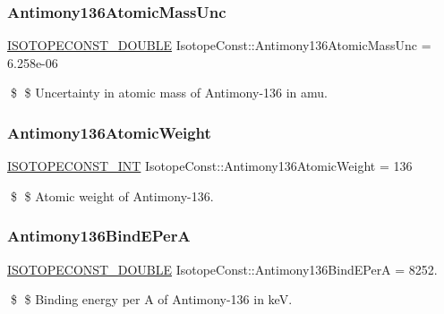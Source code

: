 \subsubsection{\texorpdfstring{Antimony136\+Atomic\+Mass\+Unc}{Antimony136AtomicMassUnc}}
{\footnotesize\ttfamily \mbox{\hyperlink{group___isotope_const-_macros_ga8f45a7272ce02c0b4c65c44636ed719a}{I\+S\+O\+T\+O\+P\+E\+C\+O\+N\+S\+T\+\_\+\+D\+O\+U\+B\+LE}} Isotope\+Const\+::\+Antimony136\+Atomic\+Mass\+Unc = 6.\+258e-\/06}

\$ \$ Uncertainty in atomic mass of Antimony-\/136 in amu. \mbox{\label{group___isotope_const-_antimony-_sb136_ga4523e8831250f585dc2350383171b064}} 
\subsubsection{\texorpdfstring{Antimony136\+Atomic\+Weight}{Antimony136AtomicWeight}}
{\footnotesize\ttfamily \mbox{\hyperlink{group___isotope_const-_macros_ga5f18360b3e99483a35c32d789e62621c}{I\+S\+O\+T\+O\+P\+E\+C\+O\+N\+S\+T\+\_\+\+I\+NT}} Isotope\+Const\+::\+Antimony136\+Atomic\+Weight = 136}

\$ \$ Atomic weight of Antimony-\/136. \mbox{\label{group___isotope_const-_antimony-_sb136_gaae8f900822e51af45382ef4fa738f702}} 
\subsubsection{\texorpdfstring{Antimony136\+Bind\+E\+PerA}{Antimony136BindEPerA}}
{\footnotesize\ttfamily \mbox{\hyperlink{group___isotope_const-_macros_ga8f45a7272ce02c0b4c65c44636ed719a}{I\+S\+O\+T\+O\+P\+E\+C\+O\+N\+S\+T\+\_\+\+D\+O\+U\+B\+LE}} Isotope\+Const\+::\+Antimony136\+Bind\+E\+PerA = 8252.}

\$ \$ Binding energy per A of Antimony-\/136 in keV. \mbox{\label{group___isotope_const-_antimony-_sb136_ga1b09e9b4d3dbfbfc9852b6ebb450373e}} 
